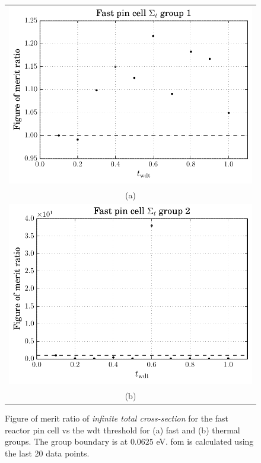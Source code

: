 \begin{figure}[hbtp]
  \centering
  \begin{tabular}{c}
  \includegraphics[scale=0.9]{images/results/fast_inf_tot_grp_1} \\
    (a) \\
  \includegraphics[scale=0.9]{images/results/fast_inf_tot_grp_2} \\
    (b)
  \end{tabular}
  \caption[Figure of merit ratio of the  \textit{infinite total cross-section} for the
  fast reactor pin cell]{Figure of merit ratio of
     \textit{infinite total cross-section} for the fast reactor pin cell vs the \gls{wdt}
    threshold for (a) fast and (b) thermal groups. The group
    boundary is at $0.0625$ eV. \gls{fom} is calculated using the last
    20 data points.}
  \label{fig:fast_inf_tot}
\end{figure}
